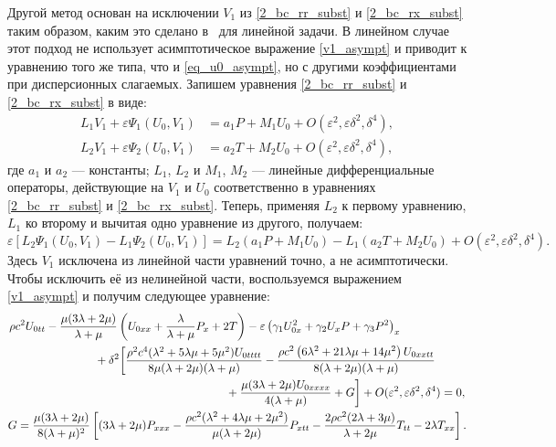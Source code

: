 \documentclass[12pt, a4paper]{report}
\newcommand{\lb}{\left (}
\newcommand{\rb}{\right )}
\begin{document}
Другой метод основан на исключении $V_1$ из \eqref{2_bc_rr_subst} и \eqref{2_bc_rx_subst} таким образом, каким это сделано в~\cite{bostrm2000} для линейной задачи. В линейном случае этот подход не использует асимптотическое выражение \eqref{v1_asympt} и приводит к уравнению того же типа, что и \eqref{eq_u0_asympt}, но с другими коэффициентами при дисперсионных слагаемых. Запишем уравнения \eqref{2_bc_rr_subst} и \eqref{2_bc_rx_subst} в виде:
\begin{align}%
L_{1} V_1 + \varepsilon\Psi_1(U_0, V_1) &= a_1 P + M_1 U_0 + O(\varepsilon^2, \varepsilon\delta^2, \delta^4),\\
L_{2} V_1 + \varepsilon\Psi_2(U_0, V_1) &= a_2 T + M_2 U_0 + O(\varepsilon^2, \varepsilon\delta^2, \delta^4),
\end{align}
где $a_1$ и $a_2$ --- константы; $L_{1}$, $L_{2}$ и $M_{1}$, $M_{2}$ --- линейные дифференциальные операторы, действующие на $V_1$ и $U_0$ соответственно в уравнениях \eqref{2_bc_rr_subst} и \eqref{2_bc_rx_subst}. Теперь, применяя $L_{2}$ к первому уравнению, $L_{1}$ ко второму и вычитая одно уравнение из другого, получаем:
\begin{equation}
\varepsilon [L_{2}\Psi_1(U_0, V_1) - L_{1}\Psi_2(U_0, V_1)] =  L_{2}\lb a_1 P + M_1 U_0\rb - L_{1}\lb a_2 T + M_2 U_0\rb + O(\varepsilon^2, \varepsilon\delta^2, \delta^4).
\end{equation}
Здесь $V_1$ исключена из линейной части уравнений точно, а не асимптотически. Чтобы исключить её из нелинейной части, воспользуемся выражением \eqref{v1_asympt} и получим следующее уравнение:
\begin{gather} \label{eq_u0_bostr}
\begin{split}
\rho c^2 U_{0tt} &- \frac{\mu(3\lambda + 2\mu)}{\lambda + \mu} \left(U_{0xx} + \frac{\lambda}{\lambda + \mu} P_x + 2T\right)
- \varepsilon \left(\gamma_1 U_{0x}^2 + \gamma_2 U_x P + \gamma_3 P^2 \right)_x \\
&\hspace{15mm}+ \delta^2 \bigg[\frac{\rho ^2 c^4 (\lambda^2 + 5\lambda\mu + 5\mu^2) U_{0tttt}}{8\mu(\lambda+2\mu)(\lambda+\mu)} - \frac{\rho c^2 \left(6\lambda^2 + 21\lambda \mu + 14\mu^2\right) U_{0xxtt}}{8(\lambda + 2\mu)(\lambda + \mu)} \\
&\hspace{55mm} + \frac{\mu(3\lambda + 2\mu) U_{0xxxx}}{4(\lambda + \mu)} + G\bigg] + O(\varepsilon^2, \varepsilon\delta^2, \delta^4) = 0,
\end{split}\\
\nonumber
G  = \frac{\mu(3\lambda + 2\mu)}{8(\lambda + \mu)^2} \left[(3\lambda + 2\mu) P_{xxx} - \frac{\rho c^2(\lambda^2 + 4\lambda\mu + 2\mu^2)}{\mu(\lambda + 2\mu)} P_{xtt} - \frac{2\rho c^2 (2\lambda + 3\mu)}{\lambda + 2\mu} T_{tt} - 2\lambda T_{xx}\right]. 
\end{gather}
\end{document}

